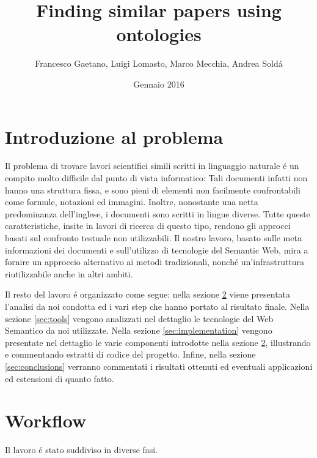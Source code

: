 \documentclass[11pt,a4paper]{article}
\begin{document}
\title{Finding similar papers using ontologies}
\author{Francesco Gaetano, Luigi Lomasto, Marco Mecchia, Andrea Sold\'a }
\date{Gennaio 2016}
\maketitle
\section{Introduzione al problema}
Il problema di trovare lavori scientifici simili scritti in linguaggio naturale \'e un compito molto difficile dal punto di vista informatico: Tali documenti infatti non hanno una struttura fissa, e sono pieni  di elementi non facilmente confrontabili come formule, notazioni ed immagini. Inoltre, nonostante una netta predominanza dell'inglese, i documenti sono scritti in lingue diverse. Tutte queste caratteristiche, insite in lavori di ricerca di questo tipo, rendono gli approcci basati sul confronto testuale non utilizzabili. Il nostro lavoro, basato sulle meta informazioni dei documenti e sull'utilizzo di tecnologie del Semantic Web, mira a fornire un approccio alternativo ai metodi tradizionali, nonch\'e un'infrastruttura riutilizzabile anche in altri ambiti.

Il resto del lavoro \'e organizzato come segue: nella sezione \ref{sec:workflow} viene presentata l'analisi da noi condotta ed i vari step che hanno portato al risultato finale. Nella sezione \ref{sec:tools} vengono analizzati nel dettaglio le tecnologie del Web Semantico da noi utilizzate. Nella sezione \ref{sec:implementation} vengono presentate nel dettaglio le varie componenti introdotte nella sezione \ref{sec:workflow}, illustrando e commentando estratti di codice del progetto. Infine, nella sezione \ref{sec:conclusions} verranno commentati i risultati ottenuti ed eventuali applicazioni ed estensioni di quanto fatto.

\section{Workflow}
\label{sec:workflow}
Il lavoro \'e stato suddiviso in diverse fasi. 
\end{document}
